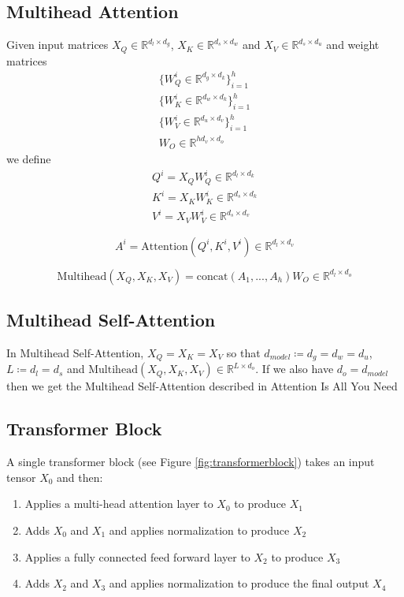 \documentclass[11pt]{article}
\theoremstyle{definition}
\begin{document}
\subsection{Multihead Attention}
Given input matrices $X_Q \in \mathbb{R}^{d_l \times d_g}$, $X_K \in \mathbb{R}^{d_s \times d_w}$ and $X_V \in \mathbb{R}^{d_s \times d_u}$ and weight matrices
\begin{gather}
\nonumber \{W_Q^i \in \mathbb{R}^{d_g \times d_k} \}_{i=1}^h \\
\{W_K^i \in \mathbb{R}^{d_w \times d_k} \}_{i=1}^h \\
\nonumber \{W_V^i \in \mathbb{R}^{d_u \times d_v} \}_{i=1}^h \\
W_O \in \mathbb{R}^{hd_v \times d_o}
\end{gather}
we define
\begin{gather}
\nonumber Q^i = X_QW_Q^i \in \mathbb{R}^{d_l \times d_k} \\
K^i = X_KW_K^i \in \mathbb{R}^{d_s \times d_k} \\
\nonumber V^i = X_VW_V^i \in \mathbb{R}^{d_s \times d_v}
\end{gather}

\begin{equation}
A^i = \mathrm{Attention} \left(Q^i,K^i,V^i \right) \in \mathbb{R}^{d_l \times d_v}
\end{equation}

\begin{equation}
\mathrm{Multihead}\left(X_Q, X_K, X_V \right) =
\mathrm{concat} \left( A_1, ... , A_h \right)W_O
\in \mathbb{R}^{d_l \times d_o}
\end{equation}

\subsection{Multihead Self-Attention}

In Multihead Self-Attention, $X_Q = X_K = X_V$ so that $d_{model} \coloneqq d_g = d_w = d_u$, $L \coloneqq d_l = d_s$ and $\mathrm{Multihead}\left(X_Q, X_K, X_V \right) \in \mathbb{R}^{L \times d_o}$. If we also have $d_o = d_{model}$ then we get the Multihead Self-Attention described in \cite{vaswani2017attention}{Attention Is All You Need}

\subsection{Transformer Block}

A single transformer block (see Figure \ref{fig:transformerblock}) takes an input tensor $X_0$ and then:
\begin{enumerate}
\item Applies a multi-head attention layer to $X_0$ to produce $X_1$
\item Adds $X_0$ and $X_1$ and applies normalization to produce $X_2$
\item Applies a fully connected feed forward layer to $X_2$ to produce $X_3$
\item Adds $X_2$ and $X_3$ and applies normalization to produce the final output $X_4$
\end{enumerate}
\end{document}
